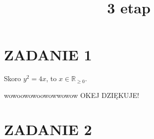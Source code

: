 \documentclass{article}
\title{3 etap}
\date{}
\begin{document}


\section*{ZADANIE 1}
Skoro \(y^2 = 4x\), to \(x\in\mathbb{R}_{\geq 0}\). 



\begin{tcolorbox}[colback=red!5!white,colframe=red!75!black,title=Rozwiązanie]
    wowoowowoowowwowow OKEJ DZIĘKUJE!
\end{tcolorbox}

\section*{ZADANIE 2}
\end{document}
